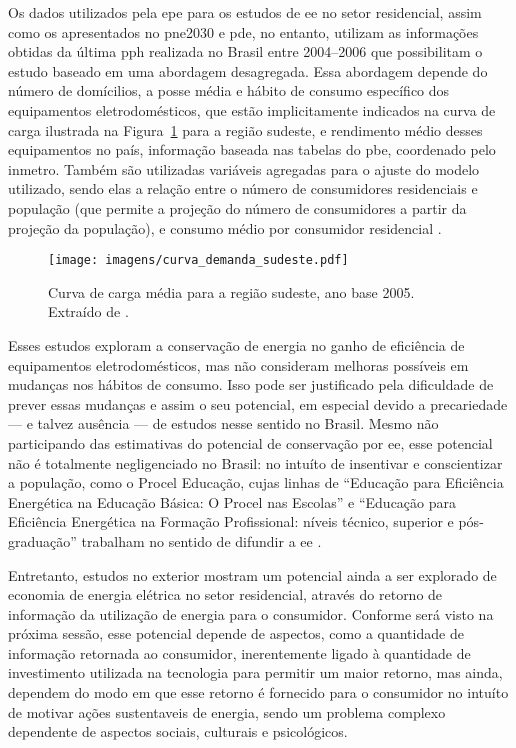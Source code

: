 Os dados utilizados pela \gls{epe} para os estudos de \gls{ee} no setor
residencial, assim como os apresentados no \gls{pne2030} e \gls{pde}, no entanto,
utilizam as informações obtidas da última \gls{pph} realizada no Brasil entre 2004--2006 
que possibilitam o estudo baseado em uma abordagem desagregada. Essa abordagem 
depende do número de domícilios, a posse média e hábito de consumo específico 
dos equipamentos eletrodomésticos, que estão implicitamente indicados na curva de carga
ilustrada na Figura~\ref{fig:curva_carga} para a região sudeste, e rendimento médio desses 
equipamentos no país, informação baseada nas tabelas do \gls{pbe}, coordenado pelo \gls{inmetro}. 
Também são utilizadas variáveis agregadas para o ajuste do modelo
utilizado, sendo elas a relação entre o número de consumidores residenciais e população 
(que permite a projeção do número de consumidores a partir da projeção da população), 
e consumo médio por consumidor residencial
\cite{epe_eficiencia_2012,pde_2012,pne30_eff_energ}. 

\begin{figure}[h!t]
\centering
\texttt{[image: imagens/curva\_demanda\_sudeste.pdf]}
\caption[Curva de carga média para a região sudeste, ano base 2005.]{Curva de
carga média para a região sudeste, ano base 2005. Extraído de
\cite{result_procel_2005}.}
\label{fig:curva_carga}
\end{figure}

Esses estudos exploram a conservação de energia no ganho de eficiência 
de equipamentos eletrodomésticos, mas não consideram melhoras possíveis 
em mudanças nos hábitos de consumo. 
Isso pode ser justificado pela dificuldade de prever essas mudanças 
e assim o seu potencial, em especial devido a precariedade --- e talvez ausência
--- de estudos nesse sentido no Brasil. Mesmo não participando das
estimativas do potencial de conservação por \gls{ee}, esse potencial não é totalmente 
negligenciado no Brasil:  no intuíto de insentivar e 
conscientizar a população, como o Procel Educação, cujas linhas de ``Educação para Eficiência
Energética na Educação Básica: O Procel nas Escolas'' e ``Educação para
Eficiência Energética na Formação Profissional: níveis técnico, superior e
pós-graduação'' trabalham no sentido de difundir a \gls{ee}
\cite{procel_resultados_2012}.

Entretanto, estudos no exterior mostram um potencial ainda a ser explorado de
economia de energia elétrica no setor residencial, através do retorno de
informação da utilização de energia para o consumidor. Conforme será visto na
próxima sessão, esse potencial depende de aspectos, como a quantidade 
de informação retornada ao consumidor, inerentemente ligado à quantidade de
investimento utilizada na tecnologia para permitir um maior retorno, mas ainda,
dependem do modo em que esse retorno é fornecido para o consumidor no intuíto de
motivar ações sustentaveis de energia, sendo um problema complexo dependente de
aspectos sociais, culturais e psicológicos. 

